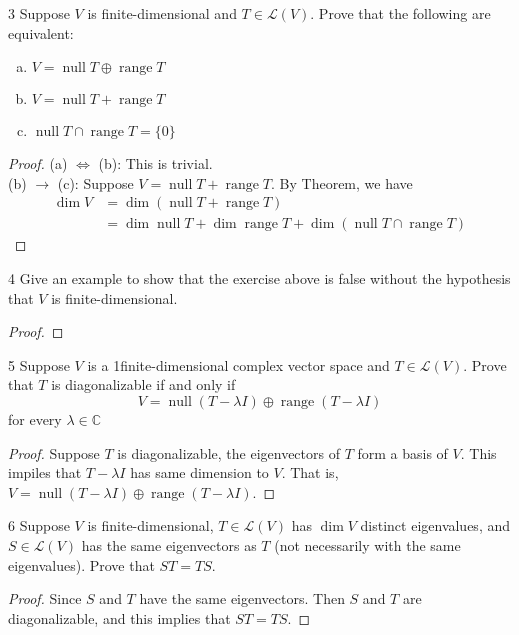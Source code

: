 \documentclass{article}
\newenvironment{problem}[1]{\begin{prob*}{#1}{}}{\end{prob*}}
\DeclareMathOperator{\Null}{null}
\DeclareMathOperator{\Range}{range}
\begin{document}
\begin{problem}{3}
Suppose $V$ is finite-dimensional and $T \in \mathcal{L}(V)$.
Prove that the following are equivalent:
\begin{enumerate}[(a)]
	\item $V = \Null T \oplus \Range T$
	\item $V = \Null T + \Range T$
	\item $\Null T \cap \Range T = \{0\}$
\end{enumerate}
\end{problem}
\begin{proof}
	(a) $\iff$ (b): This is trivial. \\
	(b) $\to$ (c): Suppose $V = \Null T + \Range T$. By Theorem, we have
	\begin{align*}
		\dim V & = \dim (\Null T + \Range T)                                     \\
		       & = \dim \Null T + \dim \Range T + \dim ( \Null T \cap \Range T )
	\end{align*}
\end{proof}

\begin{problem}{4}
Give an example to show that the exercise above is false without
the hypothesis that $V$ is finite-dimensional.
\end{problem}

\begin{proof}
\end{proof}

\begin{problem}{5}
Suppose $V$ is a 1finite-dimensional complex vector space and
$T \in \mathcal{L}(V)$. Prove that $T$ is diagonalizable if and only if \[
	V = \Null (T - \lambda I) \oplus \Range (T - \lambda I)\]
for every $\lambda \in \mathbb{C}$
\end{problem}
\begin{proof}
	Suppose $T$ is diagonalizable, the eigenvectors of
	$T$ form a basis of $V$. This impiles that $T - \lambda I$
	has same dimension to $V$. That is, $V = \Null (T - \lambda I) \oplus \Range (T - \lambda I)$.
\end{proof}

\begin{problem}{6}
Suppose $V$ is finite-dimensional, $T \in \mathcal{L}(V)$ has $\dim V$ distinct
eigenvalues, and $S \in \mathcal{L}(V)$ has the same eigenvectors as $T$
(not necessarily with the same eigenvalues). Prove that $ST = TS$.
\end{problem}
\begin{proof}
	Since $S$ and $T$ have the same eigenvectors.
	Then $S$ and $T$ are diagonalizable, and this implies that $ST = TS$.
\end{proof}
\end{document}
